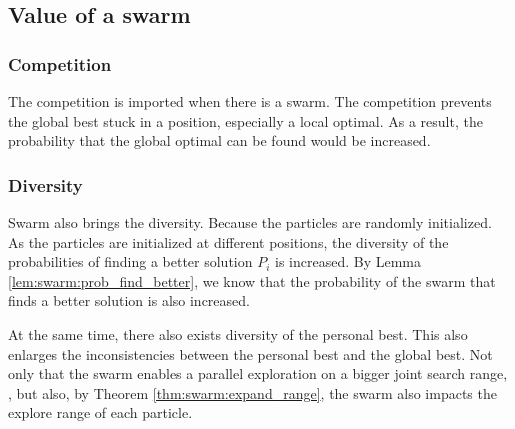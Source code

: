 \subsection{Value of a swarm}




\subsubsection{Competition}

The competition is imported when there is a swarm.
The competition prevents the global best stuck in a position, especially a local optimal.
As a result, the probability that the global optimal can be found would be increased.

\subsubsection{Diversity}

Swarm also brings the diversity.
Because the particles are randomly initialized.
As the particles are initialized at different positions, the diversity of the probabilities of finding a better solution $ P_{i} $ is increased.
By Lemma \ref{lem:swarm:prob_find_better}, we know that the probability of the swarm that finds a better solution is also increased.

At the same time, there also exists diversity of the personal best.
This also enlarges the inconsistencies between the personal best and the global best.
Not only that the swarm enables a parallel exploration on a bigger joint search range,
, but also, by Theorem \ref{thm:swarm:expand_range}, the swarm also impacts the explore range of each particle.

